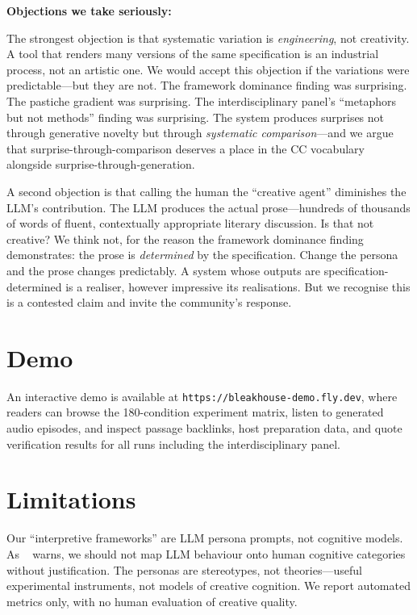 \documentclass[letterpaper]{article}
\begin{document}
\textbf{Objections we take seriously:}

The strongest objection is that systematic variation is
\emph{engineering}, not creativity.  A tool that renders many versions
of the same specification is an industrial process, not an artistic
one.  We would accept this objection if the variations were
predictable---but they are not.  The framework dominance finding was
surprising.  The pastiche gradient was surprising.  The
interdisciplinary panel's ``metaphors but not methods'' finding was
surprising.  The system produces surprises not through generative
novelty but through \emph{systematic comparison}---and we argue that
surprise-through-comparison deserves a place in the CC vocabulary
alongside surprise-through-generation.

A second objection is that calling the human the ``creative agent''
diminishes the LLM's contribution.  The LLM produces the actual
prose---hundreds of thousands of words of fluent, contextually
appropriate literary discussion.  Is that not creative?  We think not,
for the reason the framework dominance finding demonstrates: the prose is
\emph{determined} by the specification.  Change the persona and the
prose changes predictably.  A system whose outputs are
specification-determined is a realiser, however impressive its
realisations.  But we recognise this is a contested claim and invite
the community's response.

\section{Demo}

An interactive demo is available at
{\small\tt https://bleakhouse-demo.fly.dev}, where readers can browse
the 180-condition experiment matrix, listen to generated audio
episodes, and inspect passage backlinks, host preparation data, and
quote verification results for all runs including the interdisciplinary
panel.

\section{Limitations}

Our ``interpretive frameworks'' are LLM persona prompts, not cognitive
models.  As \citeauthor{shanahan2024talking}~
warns, we should not map LLM behaviour onto human cognitive categories
without justification.  The personas are stereotypes, not
theories---useful experimental instruments, not models of creative
cognition.  We report automated metrics only, with no human evaluation
of creative quality.
\end{document}
